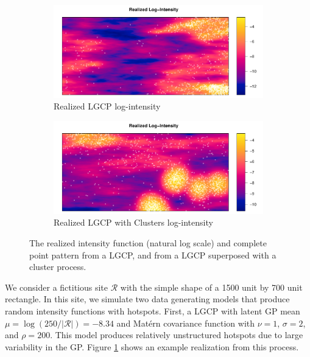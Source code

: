 \documentclass[review]{elsarticle}
\begin{document}
\begin{figure}

\begin{subfigure}{5in}
\includegraphics[width=5in]{../graphics/lambda-LGCP000004.pdf}
\caption{Realized LGCP log-intensity}
\label{lambdalgcp}
\end{subfigure}

\begin{subfigure}{5in}
\includegraphics[width=5in]{../graphics/lambda-Cluster000004.pdf}
\caption{Realized LGCP with Clusters log-intensity}
\label{lambdacluster}
\end{subfigure}

\caption{The realized intensity function (natural log scale) and complete
point pattern from a LGCP, and from a LGCP superposed with a cluster process.}
\label{fulldata}
\end{figure}

We consider a fictitious site \(\mathcal{R}\) with the simple shape of a 1500
unit by 700 unit rectangle. In this site, we simulate two data generating
models that produce random intensity functions with hotspots. First, a LGCP
with latent GP mean \(\mu = \log(250 / |\mathcal{R}|) = -8.34\) and
Mat\'{e}rn covariance function with \(\nu = 1\), \(\sigma = 2\), and
\(\rho = 200\). This model produces relatively unstructured hotspots due to
large variability in the GP. Figure \ref{lambdalgcp} shows an example
realization from this process.
\end{document}
